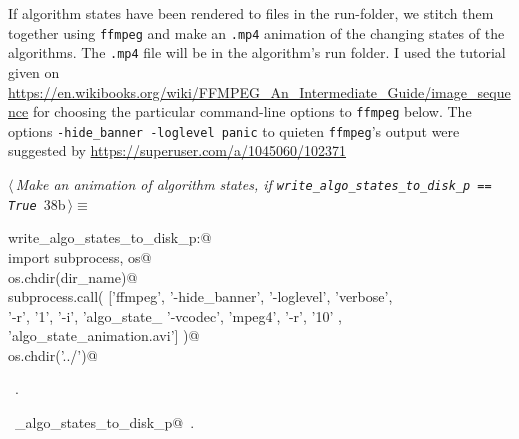 \documentclass[11.5pt]{report}
\begin{document}
\vspace{-0.8cm}\newchunk If algorithm states have been rendered to files in the run-folder, we stitch them together using \verb|ffmpeg|
and make an \verb|.mp4| animation of the changing states of the algorithms. The \verb|.mp4| file will be in the algorithm's
run folder. I used the  tutorial given on \url{https://en.wikibooks.org/wiki/FFMPEG_An_Intermediate_Guide/image_sequence}
for choosing the particular command-line options to \verb|ffmpeg| below. The options \texttt{-hide\_banner -loglevel panic} 
to quieten \verb|ffmpeg|'s output were suggested by  \url{https://superuser.com/a/1045060/102371} 


\begin{flushleft} \small\label{scrap52}\raggedright\small
{} $\langle\,${\itshape Make an animation of algorithm states, if \verb|write_algo_states_to_disk_p == True|}\nobreak\ {\footnotesize {38b}}$\,\rangle\equiv$
\vspace{-1ex}
\begin{list}{}{} \item
\mbox{}\verb@if write_algo_states_to_disk_p:@\\
\mbox{}\verb@     import subprocess, os@\\
\mbox{}\verb@     os.chdir(dir_name)@\\
\mbox{}\verb@     subprocess.call( ['ffmpeg',  '-hide_banner', '-loglevel', 'verbose', \@\\
\mbox{}\verb@                       '-r', '1',  '-i', 'algo_state_%05d.png', \@\\
\mbox{}\verb@                       '-vcodec', 'mpeg4', '-r', '10' , \@\\
\mbox{}\verb@                       'algo_state_animation.avi']  )@\\
\mbox{}\verb@     os.chdir('../')@\\
\mbox{}\verb@@{\NWsep}
\end{list}
\vspace{-1.5ex}
\footnotesize
\begin{list}{}{\setlength{\itemsep}{-\parsep}\setlength{\itemindent}{-\leftmargin}}
\item \NWtxtMacroRefIn\ .
\item \NWtxtIdentsUsed\nobreak\  \verb@write_algo_states_to_disk_p@\nobreak\ .
\item{}
\end{list}
\vspace{4ex}
\end{flushleft}
\end{document}

